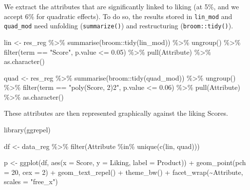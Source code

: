 \documentclass[
]{krantz}
\makeatletter
\newenvironment{Shaded}{\begin{snugshade}}{\end{snugshade}}
\newcommand{\AttributeTok}[1]{\textcolor[rgb]{0.61,0.61,0.61}{#1}}
\newcommand{\DecValTok}[1]{\textcolor[rgb]{0.06,0.06,0.06}{#1}}
\newcommand{\FloatTok}[1]{\textcolor[rgb]{0.06,0.06,0.06}{#1}}
\newcommand{\FunctionTok}[1]{\textcolor[rgb]{0,0,0}{#1}}
\newcommand{\NormalTok}[1]{#1}
\newcommand{\OtherTok}[1]{\textcolor[rgb]{0.37,0.37,0.37}{#1}}
\newcommand{\SpecialCharTok}[1]{\textcolor[rgb]{0,0,0}{#1}}
\newcommand{\StringTok}[1]{\textcolor[rgb]{0.5,0.5,0.5}{#1}}
\newenvironment{kframe}{%
\medskip{}
\setlength{\fboxsep}{.8em}
 \def\at@end@of@kframe{}%
 \ifinner\ifhmode%
  \def\at@end@of@kframe{\end{minipage}}%
  \begin{minipage}{\columnwidth}%
 \fi\fi%
 \def\FrameCommand##1{\hskip\@totalleftmargin \hskip-\fboxsep
 \colorbox{shadecolor}{##1}\hskip-\fboxsep
     \hskip-\linewidth \hskip-\@totalleftmargin \hskip\columnwidth}%
 \MakeFramed {\advance\hsize-\width
   \@totalleftmargin\z@ \linewidth\hsize
   \@setminipage}}%
 {\par\unskip\endMakeFramed%
 \at@end@of@kframe}
\renewenvironment{Shaded}{\begin{kframe}}{\end{kframe}}
\makeatother
\begin{document}
We extract the attributes that are significantly linked to liking (at 5\%, and we accept 6\% for quadratic effects). To do so, the results stored in \texttt{lin\_mod} and \texttt{quad\_mod} need unfolding (\texttt{summarize()}) and restructuring (\texttt{broom::tidy()}).

\begin{Shaded}
\begin{Highlighting}[]
\NormalTok{lin }\OtherTok{\textless{}{-}}\NormalTok{ res\_reg }\SpecialCharTok{\%\textgreater{}\%}
  \FunctionTok{summarise}\NormalTok{(broom}\SpecialCharTok{::}\FunctionTok{tidy}\NormalTok{(lin\_mod)) }\SpecialCharTok{\%\textgreater{}\%}
  \FunctionTok{ungroup}\NormalTok{() }\SpecialCharTok{\%\textgreater{}\%}
  \FunctionTok{filter}\NormalTok{(term }\SpecialCharTok{==} \StringTok{"Score"}\NormalTok{, p.value }\SpecialCharTok{\textless{}=} \FloatTok{0.05}\NormalTok{) }\SpecialCharTok{\%\textgreater{}\%}
  \FunctionTok{pull}\NormalTok{(Attribute) }\SpecialCharTok{\%\textgreater{}\%}
  \FunctionTok{as.character}\NormalTok{()}

\NormalTok{quad }\OtherTok{\textless{}{-}}\NormalTok{ res\_reg }\SpecialCharTok{\%\textgreater{}\%}
  \FunctionTok{summarise}\NormalTok{(broom}\SpecialCharTok{::}\FunctionTok{tidy}\NormalTok{(quad\_mod)) }\SpecialCharTok{\%\textgreater{}\%}
  \FunctionTok{ungroup}\NormalTok{() }\SpecialCharTok{\%\textgreater{}\%}
  \FunctionTok{filter}\NormalTok{(term }\SpecialCharTok{==} \StringTok{"poly(Score, 2)2"}\NormalTok{, p.value }\SpecialCharTok{\textless{}=} \FloatTok{0.06}\NormalTok{) }\SpecialCharTok{\%\textgreater{}\%}
  \FunctionTok{pull}\NormalTok{(Attribute) }\SpecialCharTok{\%\textgreater{}\%}
  \FunctionTok{as.character}\NormalTok{()}
\end{Highlighting}
\end{Shaded}

These attributes are then represented graphically against the liking Scores.

\begin{Shaded}
\begin{Highlighting}[]
\FunctionTok{library}\NormalTok{(ggrepel)}

\NormalTok{df }\OtherTok{\textless{}{-}}\NormalTok{ data\_reg }\SpecialCharTok{\%\textgreater{}\%}
  \FunctionTok{filter}\NormalTok{(Attribute }\SpecialCharTok{\%in\%} \FunctionTok{unique}\NormalTok{(}\FunctionTok{c}\NormalTok{(lin, quad)))}

\NormalTok{p }\OtherTok{\textless{}{-}} \FunctionTok{ggplot}\NormalTok{(df, }\FunctionTok{aes}\NormalTok{(}\AttributeTok{x =}\NormalTok{ Score, }\AttributeTok{y =}\NormalTok{ Liking, }\AttributeTok{label =}\NormalTok{ Product)) }\SpecialCharTok{+}
  \FunctionTok{geom\_point}\NormalTok{(}\AttributeTok{pch =} \DecValTok{20}\NormalTok{, }\AttributeTok{cex =} \DecValTok{2}\NormalTok{) }\SpecialCharTok{+}
  \FunctionTok{geom\_text\_repel}\NormalTok{() }\SpecialCharTok{+}
  \FunctionTok{theme\_bw}\NormalTok{() }\SpecialCharTok{+}
  \FunctionTok{facet\_wrap}\NormalTok{(}\SpecialCharTok{\textasciitilde{}}\NormalTok{Attribute, }\AttributeTok{scales =} \StringTok{"free\_x"}\NormalTok{)}
\end{Highlighting}
\end{Shaded}
\end{document}
